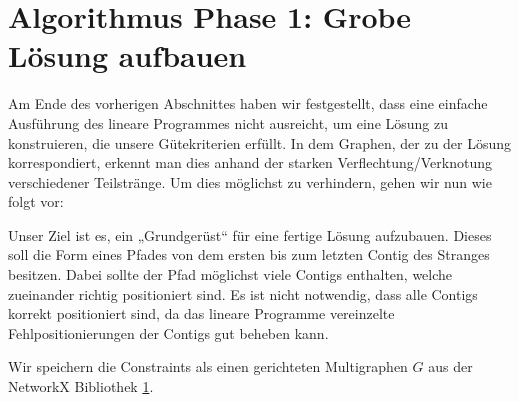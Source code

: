 



\newpage
\section{Algorithmus Phase 1: Grobe Lösung aufbauen}

Am Ende des vorherigen Abschnittes haben wir festgestellt, dass eine einfache Ausführung des lineare Programmes nicht ausreicht, um eine Lösung zu konstruieren, die unsere Gütekriterien erfüllt. 
In dem Graphen, der zu der Lösung korrespondiert, erkennt man dies anhand der starken Verflechtung/Verknotung verschiedener Teilstränge. Um dies möglichst zu verhindern, gehen wir nun wie folgt vor:

Unser Ziel ist es, ein „Grundgerüst“ für eine fertige Lösung aufzubauen.
Dieses soll die Form eines Pfades von dem ersten bis zum letzten Contig des Stranges besitzen.
Dabei sollte der Pfad möglichst viele Contigs enthalten, welche zueinander richtig positioniert sind.
Es ist nicht notwendig, dass alle Contigs korrekt positioniert sind, da das lineare Programme vereinzelte Fehlpositionierungen der Contigs gut beheben kann. 


Wir speichern die Constraints als einen gerichteten Multigraphen $G$ aus der NetworkX Bibliothek \ref{}.

